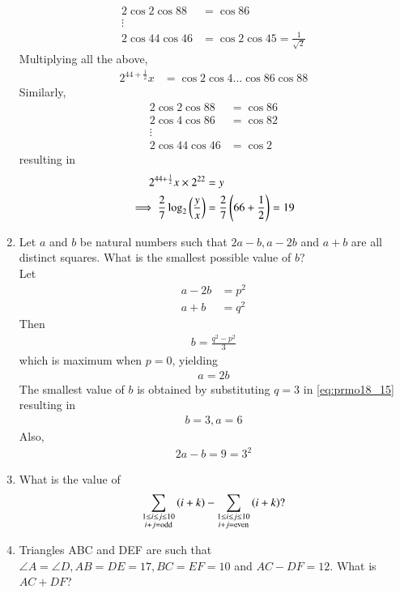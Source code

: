 \documentclass[journal,12pt,twocolumn]{IEEEtran}
\begin{document}
\begin{enumerate}[label=\arabic*]
\begin{align}
\\
2\cos 2 \cos 88 &= \cos 86
\\
\vdots
\\
2\cos 44 \cos 46 &= \cos 2
\cos 45 = \frac{1}{\sqrt{2}}
\end{align}
%
Multiplying all the above, 
\begin{align}
2^{44+\frac{1}{2}} x &= \cos 2 \cos 4 \dots \cos 86 \cos 88
\end{align}
Similarly,
\begin{align}
2\cos 2 \cos 88 &= \cos 86
\\
2\cos 4 \cos 86 &= \cos 82
\\
\vdots
\\
2\cos 44 \cos 46 &= \cos 2
\end{align}
resulting in 
\begin{align}
2^{44+\frac{1}{2}} x \times 2^{22} &= y
\\
\implies \frac{2}{7}\log_2\left(\frac{y}{x}\right) &=\frac{2}{7}\left(66+\frac{1}{2}\right) = 19
\end{align}
\item Let $a$ and $b$ be natural numbers such that $2a- b, a-2b$ and $a+b$ 
 are all distinct squares. What is the smallest possible value of $b$? 
\\ Let 
\begin{align}
a-2b &=p^2
\\
a+b &=q^2
\end{align}
%
Then 
\begin{align}
\label{eq:prmo18_15}
b = \frac{q^2-p^2}{3}
\end{align}
%
which is maximum when $p = 0$, yielding
\begin{align}
a = 2b
\end{align}
%
The smallest value of $b$ is obtained by substituting $q = 3$ in \eqref{eq:prmo18_15} resulting in
\begin{align}
b =3, a = 6
\end{align}
%
Also,
\begin{align}
2a-b =9=3^2
\end{align}
\solution 
\item What is the value of
\begin{align}
\sum_{\substack{1 \le i \le j \le 10\\i+j=\text{odd}}}\left(i+k\right)
-\sum_{\substack{1 \le i \le j \le 10\\i+j=\text{even}}}\left(i+k\right)?
\end{align}
\item Triangles ABC and DEF are such that $\angle A = \angle D, AB = DE = 17, BC = EF = 10$ and $AC -DF = 12$. What is $AC +DF$? 

\end{enumerate}
\end{document}
